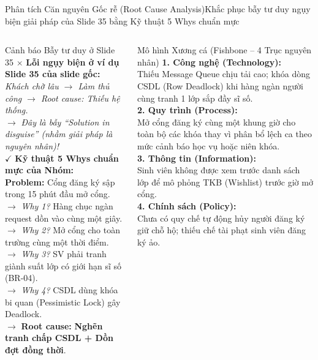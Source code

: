 \documentclass[aspectratio=169, 10pt]{beamer}
\begin{document}
\begin{frame}[t]{Phân tích Căn nguyên Gốc rễ (Root Cause Analysis)}{Khắc phục bẫy tư duy ngụy biện giải pháp của Slide 35 bằng Kỹ thuật 5 Whys chuẩn mực}
  \vspace{-0.25cm}
  \begin{columns}[T]
      \begin{alertCard}{Cảnh báo Bẫy tư duy ở Slide 35}
        \tiny
        $\times$ \textbf{Lỗi ngụy biện ở ví dụ Slide 35 của slide gốc:}\\\textit{Khách chờ lâu $\to$ Làm thủ công $\to$ Root cause: Thiếu hệ thống.}\\[0.05cm]
        $\to$ \textit{Đây là bẫy ``Solution in disguise'' (nhầm giải pháp là nguyên nhân)!}\\[0.1cm]
        $\checkmark$ \textbf{Kỹ thuật 5 Whys chuẩn mực của Nhóm:}\\
        \textbf{Problem:} Cổng đăng ký sập trong 15 phút đầu mở cổng.\\
        $\to$ \textit{Why 1?} Hàng chục ngàn request dồn vào cùng một giây.\\
        $\to$ \textit{Why 2?} Mở cổng cho toàn trường cùng một thời điểm.\\
        $\to$ \textit{Why 3?} SV phải tranh giành suất lớp có giới hạn sĩ số (BR-04).\\
        $\to$ \textit{Why 4?} CSDL dùng khóa bi quan (Pessimistic Lock) gây Deadlock.\\
        $\to$ \textbf{Root cause:} \textbf{Nghẽn tranh chấp CSDL + Dồn đợt đồng thời}.
      \end{alertCard}

      \begin{infoCard}{Mô hình Xương cá (Fishbone -- 4 Trục nguyên nhân)}
        \tiny
        \textbf{1. Công nghệ (Technology):}\\
        Thiếu Message Queue chịu tải cao; khóa dòng CSDL (Row Deadlock) khi hàng ngàn người cùng tranh 1 lớp sắp đầy sĩ số.\\[0.06cm]
        \textbf{2. Quy trình (Process):}\\
        Mở cổng đăng ký cùng một khung giờ cho toàn bộ các khóa thay vì phân bổ lệch ca theo mức cảnh báo học vụ hoặc niên khóa.\\[0.06cm]
        \textbf{3. Thông tin (Information):}\\
        Sinh viên không được xem trước danh sách lớp để mô phỏng TKB (Wishlist) trước giờ mở cổng.\\[0.06cm]
        \textbf{4. Chính sách (Policy):}\\
        Chưa có quy chế tự động hủy người đăng ký giữ chỗ hộ; thiếu chế tài phạt sinh viên đăng ký ảo.
      \end{infoCard}
  \end{columns}
\end{frame}
\end{document}

